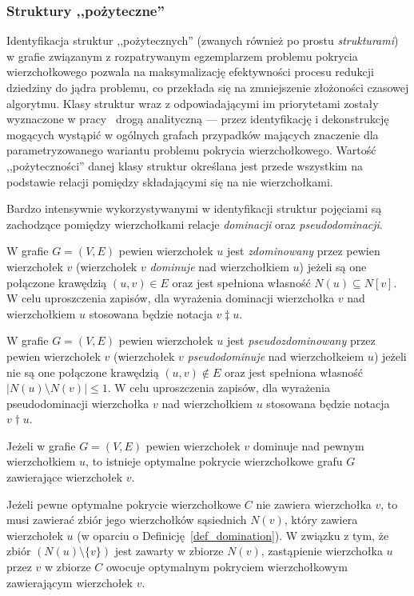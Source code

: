 \subsubsection{\textbf{Struktury ,,pożyteczne''}}
\label{sss_ckx_structures}
\par{
  Identyfikacja struktur ,,pożytecznych'' (zwanych również po prostu \emph{strukturami}) w grafie związanym z rozpatrywanym egzemplarzem problemu pokrycia wierzchołkowego pozwala na maksymalizację efektywności procesu redukcji dziedziny do jądra problemu, co przekłada się na zmniejszenie złożoności czasowej algorytmu. Klasy struktur wraz z odpowiadającymi im priorytetami zostały wyznaczone w pracy~\cite{ImprovedBounds10} drogą analityczną --- przez identyfikację i dekonstrukcję mogących wystąpić w ogólnych grafach przypadków mających znaczenie dla parametryzowanego wariantu problemu pokrycia wierzchołkowego.
  Wartość ,,pożyteczności'' danej klasy struktur określana jest przede wszystkim na podstawie relacji pomiędzy składającymi się na nie wierzchołkami.
}
\par{
  Bardzo intensywnie wykorzystywanymi w identyfikacji struktur pojęciami są zachodzące pomiędzy wierzchołkami relacje \emph{dominacji} oraz \emph{pseudodominacji}.
  \begin{definition}
    W grafie $G=(V, E)$ pewien wierzchołek $u$ jest \emph{zdominowany} przez pewien wierzchołek $v$ (wierzchołek $v$ \emph{dominuje} nad wierzchołkiem $u$) jeżeli są one połączone krawędzią $(u, v) \in E$ oraz jest spełniona własność $N(u) \subseteq N[v]$.
    W celu uproszczenia zapisów, dla wyrażenia dominacji wierzchołka $v$ nad wierzchołkiem $u$ stosowana będzie notacja $v \ddagger u$.
  \end{definition}
  \begin{definition}
    W grafie $G=(V, E)$ pewien wierzchołek $u$ jest \emph{pseudozdominowany} przez pewien wierzchołek $v$ (wierzchołek $v$ \emph{pseudodominuje} nad wierzchołkeiem $u$) jeżeli nie są one połączone krawędzią $(u, v) \notin E$ oraz jest spełniona własność $|N(u) \setminus N(v)| \leq 1$.
    W celu uproszczenia zapisów, dla wyrażenia pseudodominacji wierzchołka $v$ nad wierzchołkiem $u$ stosowana będzie notacja $v \dagger u$.
  \end{definition}
  \begin{theorem}
      Jeżeli w grafie $G=(V, E)$ pewien wierzchołek $v$ dominuje nad pewnym wierzchołkiem $u$, to istnieje optymalne pokrycie wierzchołkowe grafu $G$ zawierające wierzchołek $v$.
  \end{theorem}
  \begin{bproof}
    Jeżeli pewne optymalne pokrycie wierzchołkowe $C$ nie zawiera wierzchołka $v$, to musi zawierać zbiór jego wierzchołków sąsiednich $N(v)$, który zawiera wierzchołek $u$ (w oparciu o Definicję~\ref{def_domination}).
    W związku z tym, że zbiór $(N(u) \setminus \{v\})$ jest zawarty w zbiorze $N(v)$, zastąpienie wierzchołka $u$ przez $v$ w zbiorze $C$ owocuje optymalnym pokryciem wierzchołkowym zawierającym wierzchołek $v$.
  \end{bproof}
}
